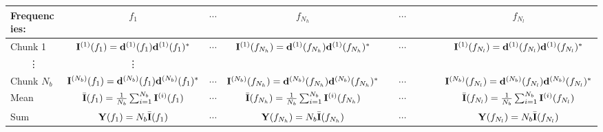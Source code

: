 \documentclass[landscape, a4paper, 11pt]{article}
\renewcommand{\d}{{\bf d}}
\newcommand{\Y}{{\bf Y}}
\renewcommand{\0}{{\bf 0}}
\renewcommand{\I}{{\bf I}}
\begin{document}
	\begin{tabular}{lccccccccc}
		\toprule Frequencies:      & $f_{1}$                                                            & $\cdots$                                             & $f_{N_h}$                                                              &          & $\cdots$                        &          &  &  & $f_{N_l}$                                                              \\
		\midrule Chunk 1           & $\I^{(1)}(f_{1}) = \d^{(1)}(f_{1})\d^{(1)}(f_{1})^{*}$             & $\cdots$                                             & $\I^{(1)}(f_{N_h}) = \d^{(1)}(f_{N_h})\d^{(1)}(f_{N_h})^{*}$           &          & $\cdots$                        &          &  &  & $\I^{(1)}(f_{N_l}) = \d^{(1)}(f_{N_l})\d^{(1)}(f_{N_l})^{*}$           \\
		\multicolumn{1}{c}{\vdots} & \vdots                                                             &                                                      &                                                                        &          &                                 &          &   \\
		Chunk $N_{b}$              & $\I^{(N_b)}(f_{1}) = \d^{(N_b)}(f_{1})\d^{(N_b)}(f_{1})^{*}$       & $\cdots$                                             & $\I^{(N_b)}(f_{N_h}) = \d^{(N_b)}(f_{N_h})\d^{(N_b)}(f_{N_h})^{*}$     &          & $\cdots$                        &          &  &  & $\I^{(N_b)}(f_{N_l}) = \d^{(N_b)}(f_{N_l})\d^{(N_b)}(f_{N_l})^{*}$     \\
		\midrule Mean              & $\bar{\I}(f_{1}) = \frac{1}{N_{b}}\sum_{i=1}^{N_b}\I^{(i)}(f_{1})$ & $\cdots$                                             & $\bar{\I}(f_{N_h}) = \frac{1}{N_{b}}\sum_{i=1}^{N_b}\I^{(i)}(f_{N_h})$ &          & $\cdots$                        &          &  &  & $\bar{\I}(f_{N_l}) = \frac{1}{N_{b}}\sum_{i=1}^{N_b}\I^{(i)}(f_{N_l})$ \\
		Sum                        & $\Y(f_{1}) = N_{b} \bar{\I}(f_{1})$                                & $\cdots$                                             & $\Y(f_{N_h}) = N_{b} \bar{\I}(f_{N_h})$                                &          & $\cdots$                        &          &  &  & $\Y(f_{N_l}) = N_{b} \bar{\I}(f_{N_l})$                                \\

\end{tabular}
\end{document}
